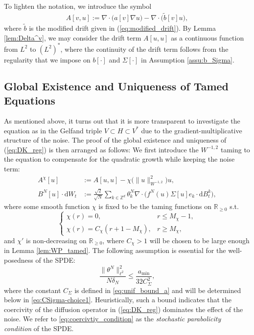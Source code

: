 To lighten the notation, we introduce the symbol
\begin{equation}\label{eq:def_A[u,v]}
\begin{split}
A[v,u] := \nabla \cdot \big(a[v]\nabla u\big) - \nabla \cdot \big(\tilde{b}[v] u\big),
\end{split}
\end{equation} 
where $\tilde{b}$ is the modified drift given in (\ref{eq:modified_drift}). By Lemma \ref{lem:Delta^v}, we may consider the drift term $A[u,u]$ as a continuous function from $L^2$ to $(L^2)^*$, where the continuity of the drift term follows from the regularity that we impose on $b[\cdot]$ and $\Sigma[\cdot]$ in Assumption \ref{assu:b_Sigma}.


\subsection{Global Existence and Uniqueness of Tamed Equations}
As mentioned above, it turns out that it is more transparent to investigate the equation as \cite{DKP23} in the Gelfand triple $V \subset H \subset V^*$ due to the gradient-multiplicative structure of the noise. The proof of the global existence and uniqueness of (\ref{eq:DK_reg}) is then arranged as follows: We first introduce the $W^{-1,2}$ taming to the equation to compensate for the quadratic growth while keeping the noise term:
\begin{equation}\label{eq:var_AB_tamed}
\begin{split}
A^{\chi}[u] & := A[u,u]- \chi\big( \|u\|_{W^{-1,2}}^2\big)u,\\
B^N[u]\cdot\mathrm{d}W_t & :=  \frac{\sqrt{2}}{\sqrt{N}}\sum_{k \in \mathbb{Z}^d}\theta_k^N\nabla \cdot\Big(f^N(u) \Sigma [u] e_k \cdot  \mathrm{d}B^k_t \Big),
\end{split}
\end{equation}
where some smooth function $\chi$ is fixed to be the taming functions on $\mathbb{R}_{\geq 0}$ s.t.
 \begin{equation}\label{eq:def_chi_tame}   
    \begin{cases}
    \chi(r) = 0, & r \leq M_{\chi} - 1,\\
    \chi(r) =C_{\chi}(r + 1 - M_{\chi}), & r \geq M_{\chi},
    \end{cases}
\end{equation}
and $\chi'$ is non-decreasing on $\mathbb{R}_{\geq 0}$, where $C_{\chi} > 1$ will be chosen to be large enough in Lemma \ref{lem:WP_tamed}. The following assumption is essential for the well-posedness of the SPDE:
\begin{equation}\label{eq:coercivtiy_condition}
   \frac{\|\theta^N\|^2_{\ell^2}}{N\delta_N } \leq  \frac{a_{\min}}{32C^2_{\Sigma}},
\end{equation}
where the constant $C_{\Sigma}$ is defined in \eqref{eq:unif_bound_a} and will be determined below in \eqref{eq:CSigma-choice1}. Heuristically, such a bound indicates that the coercivity of the diffusion operator in (\ref{eq:DK_reg}) dominates the effect of the noise. We refer to \eqref{eq:coercivtiy_condition} as the \emph{stochastic parabolicity condition} of the SPDE. \\

